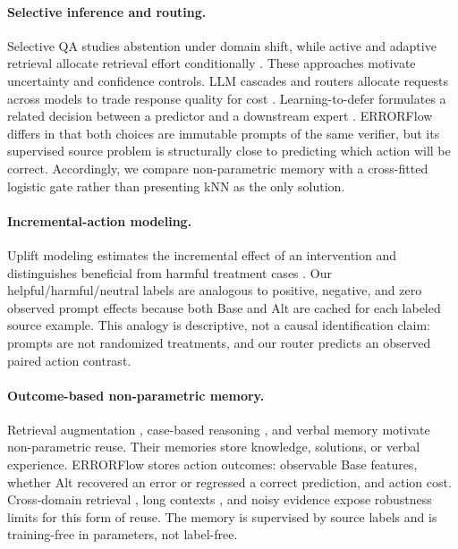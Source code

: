 \documentclass[runningheads]{llncs}
\begin{document}
\paragraph{Selective inference and routing.}
Selective QA studies abstention under domain shift, while active and adaptive
retrieval allocate retrieval effort conditionally
\cite{kamath2020selective,jiang2023active,jeong2024adaptiverag,asai2024selfrag}.
These approaches motivate uncertainty and confidence controls. LLM cascades
and routers allocate requests across models to trade response quality for cost
\cite{chen2024frugalgpt,ding2024hybrid,ong2025routellm}. Learning-to-defer
formulates a related decision between a predictor and a downstream expert
\cite{madras2018defer,mozannar2020defer}. ERRORFlow differs in that both
choices are immutable prompts of the same verifier, but its supervised source
problem is structurally close to predicting which action will be correct.
Accordingly, we compare non-parametric memory with a cross-fitted logistic
gate rather than presenting kNN as the only solution.

\paragraph{Incremental-action modeling.}
Uplift modeling estimates the incremental effect of an intervention and
distinguishes beneficial from harmful treatment cases
\cite{gutierrez2017uplift}. Our helpful/harmful/neutral labels are analogous
to positive, negative, and zero observed prompt effects because both Base and Alt
are cached for each labeled source example. This analogy is descriptive, not
a causal identification claim: prompts are not randomized treatments, and our
router predicts an observed paired action contrast.

\paragraph{Outcome-based non-parametric memory.}
Retrieval augmentation \cite{lewis2020rag}, case-based reasoning
\cite{das2021case}, and verbal memory \cite{shinn2023reflexion} motivate
non-parametric reuse. Their memories store knowledge, solutions, or verbal
experience. ERRORFlow stores action outcomes: observable Base features, whether
Alt recovered an error or regressed a correct prediction, and action cost.
Cross-domain retrieval \cite{thakur2021beir}, long contexts
\cite{liu2024lost}, and noisy evidence \cite{fang2024noise} expose robustness
limits for this form of reuse. The memory is
supervised by source labels and is training-free in parameters, not label-free.
\end{document}
